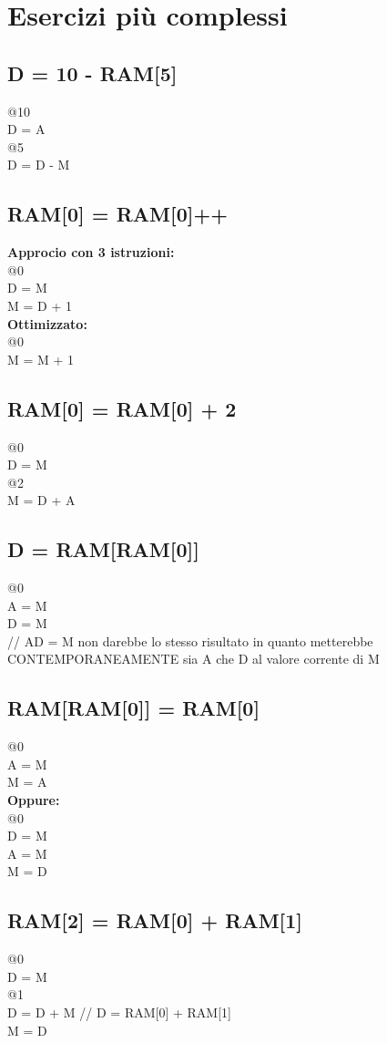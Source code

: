 \documentclass[12pt]{article}
\begin{document}
\section{Esercizi più complessi}
\subsection{D = 10 - RAM[5]}
@10 \\
D = A \\
@5 \\
D = D - M
\pagebreak
\subsection{RAM[0] = RAM[0]++}
\textbf{Approcio con 3 istruzioni:} \\
@0 \\
D = M \\
M = D + 1 \\
\textbf{Ottimizzato:} \\
@0 \\
M = M + 1 \\
\subsection{RAM[0] = RAM[0] + 2}
@0 \\
D = M \\
@2 \\
M = D + A 
\subsection{D = RAM[RAM[0]]}
@0 \\
A = M \\
D = M \\
// AD = M non darebbe lo stesso risultato in quanto metterebbe CONTEMPORANEAMENTE sia A che D al valore corrente di M
\subsection{RAM[RAM[0]] = RAM[0]}
@0 \\
A = M \\
M = A \\
\textbf{Oppure:} \\
@0 \\
D = M \\
A = M \\
M = D
\subsection{RAM[2] = RAM[0] + RAM[1]}
@0 \\
D = M \\
@1 \\
D = D + M // D = RAM[0] + RAM[1] \\
M = D
\pagebreak
\end{document}
